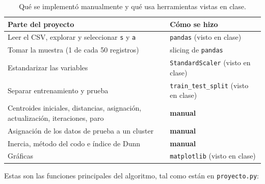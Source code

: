 \documentclass[11pt,a4paper]{article}
\begin{document}
\begin{table}[H]
  \centering
  \begin{tabular}{p{9.3cm}p{5.2cm}}
    \toprule
    Parte del proyecto & Cómo se hizo \\
    \midrule
    Leer el CSV, explorar y seleccionar \texttt{s} y \texttt{a} & \texttt{pandas} (visto en clase) \\
    Tomar la muestra (1 de cada 50 registros) & slicing de \texttt{pandas} \\
    Estandarizar las variables & \texttt{StandardScaler} (visto en clase) \\
    Separar entrenamiento y prueba & \texttt{train\_test\_split} (visto en clase) \\
    Centroides iniciales, distancias, asignación, actualización, iteraciones, paro & \textbf{manual} \\
    Asignación de los datos de prueba a un cluster & \textbf{manual} \\
    Inercia, método del codo e índice de Dunn & \textbf{manual} \\
    Gráficas & \texttt{matplotlib} (visto en clase) \\
    \bottomrule
  \end{tabular}
  \caption{Qué se implementó manualmente y qué usa herramientas vistas en clase.}
  \label{tab:manual}
\end{table}

Estas son las funciones principales del algoritmo, tal como están en \texttt{proyecto.py}:
\end{document}
